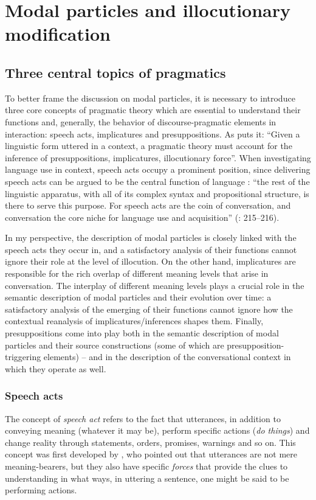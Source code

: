 \chapter{Modal particles and illocutionary modification}\label{sec:3}
\hypertarget{Toc124860614}{}\section{Three central topics of pragmatics}
\hypertarget{Toc124860615}{}
To better frame the discussion on modal particles, it is necessary to introduce three core concepts of pragmatic theory which are essential to understand their functions and, generally, the behavior of discourse-pragmatic elements in interaction: speech acts, implicatures and presuppositions. As \citet[21]{Levinson1983} puts it: “Given a linguistic form uttered in a context, a pragmatic theory must account for the inference of presuppositions, implicatures, illocutionary force”. When investigating language use in context, speech acts occupy a prominent position, since delivering speech acts can be argued to be the central function of language \citep{Searle1969}: “the rest of the linguistic apparatus, with all of its complex syntax and propositional structure, is there to serve this purpose. For speech acts are the coin of conversation, and conversation the core niche for language use and acquisition” (\citealt{Levinson2017}: 215–216).

In my perspective, the description of modal particles is closely linked with the speech acts they occur in, and a satisfactory analysis of their functions cannot ignore their role at the level of illocution. On the other hand, implicatures are responsible for the rich overlap of different meaning levels that arise in conversation. The interplay of different meaning levels plays a crucial role in the semantic description of modal particles and their evolution over time: a satisfactory analysis of the emerging of their functions cannot ignore how the contextual reanalysis of implicatures/inferences shapes them. Finally, presuppositions come into play both in the semantic description of modal particles and their source constructions (some of which are presupposition-triggering elements) – and in the description of the conversational context in which they operate as well.

\subsection{Speech acts}
\hypertarget{Toc124860616}{}
The concept of \textit{speech act} refers to the fact that utterances, in addition to conveying meaning (whatever it may be), perform specific actions (\textit{do things}) and change reality through statements, orders, promises, warnings and so on. This concept was first developed by \citet{Austin1961,Austin1962}, who pointed out that utterances are not mere meaning-bearers, but they also have specific \textit{forces} that provide the clues to understanding in what ways, in uttering a sentence, one might be said to be performing actions.

